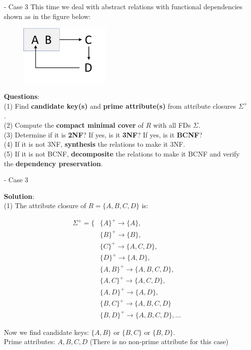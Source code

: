 \begin{frame}[fragile]{ - Case 3}
	This time we deal with abstract relations with functional dependencies shown as in the figure below:\\\vspace{-5pt}
	
	\begin{figure}
		\includegraphics[width=0.4\textwidth, trim=0 0 0 0, clip]{t5/images/case3.png}
	\end{figure}\vspace{-10pt}

	\textbf{Questions}:\\
	(1) Find \textbf{candidate key(s)} and \textbf{prime attribute(s)} from attribute closures $\Sigma^{+}$.\\
	(2) Compute the \textbf{compact minimal cover} of $R$ with all FDs $\Sigma$.\\
	(3) Determine if it is \textbf{2NF}? If yes, is it \textbf{3NF}? If yes, is it \textbf{BCNF}?\\
	(4) If it is not 3NF, \textbf{synthesis} the relations to make it 3NF.\\
	(5) If it is not BCNF, \textbf{decomposite} the relations to make it BCNF and verify the \textbf{dependency preservation}. 
\end{frame}


\begin{frame}[fragile]{ - Case 3}

	\textbf{Solution}:\\
	(1) The attribute closure of $R = \{A, B, C, D\}$ is:\\\vspace{5pt}
	\begin{scriptsize}
	\begin{align*} 
		\Sigma^{+} = \{&\{A\}^{+} \rightarrow \{A\},\\
		&\{B\}^{+} \rightarrow \{B\},\\
		&\{C\}^{+} \rightarrow \{A, C, D\},\\
		&\{D\}^{+} \rightarrow \{A, D\},\\
		&\{A, B\}^{+} \rightarrow \{A, B, C, D\},\\
		&\{A, C\}^{+} \rightarrow \{A, C, D\},\\
		&\{A, D\}^{+} \rightarrow \{A, D\},\\
		&\{B, C\}^{+} \rightarrow \{A, B, C, D\}\\
		&\{B, D\}^{+} \rightarrow \{A, B, C, D\}, ...
	\end{align*}
	\end{scriptsize}

	Now we find candidate keys: $\{A, B\}$ or $\{B, C\}$ or $\{B, D\}$.\\
	Prime attributes: $A, B, C, D$ (There is no non-prime attribute for this case)
\end{frame}

